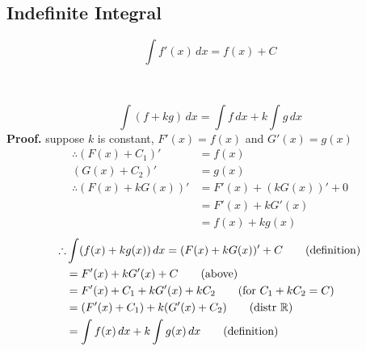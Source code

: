 	\subsection{Indefinite Integral}
		\begin{definition}
			$$\int f'(x)\,dx=f(x)+C$$
		\end{definition}\,\\
		\begin{theorem}[Linearity]
			$$\int(f+kg)\,dx=\int f\,dx+k\int g\,dx$$
			\textbf{Proof.} suppose $k$ is constant, $F'(x)=f(x)$ and $G'(x)=g(x)$
			\begin{align*}
				\therefore(F(x)+C_1)'&=f(x)\tag*{for const $C_1$}\\
			    (G(x)+C_2)'&=g(x)\tag*{for const $C_2$}\\
				\therefore(F(x)+kG(x))'&=F'(x)+(kG(x))'+0\tag*{(sum rule)}\\
							 &=F'(x)+kG'(x)\tag*{(const-mul rule)}\\
							 &=f(x)+kg(x)
			\end{align*}
			\begin{align*}
				\therefore&\int(f(x)+kg(x))\,dx=(F(x)+kG(x))'+C\tag*{(definition)}\\
					   &=F'(x)+kG'(x)+C\tag*{(above)}\\
					   &=F'(x)+C_1+kG'(x)+kC_2\tag*{(for $C_1+kC_2=C$)}\\
					   &=(F'(x)+C_1)+k(G'(x)+C_2)\tag*{(distr $\mathbb{R}$)}\\
					   &=\int f(x)\,dx+k\int g(x)\,dx\tag*{(definition)}\\
			\end{align*}
		\end{theorem}
